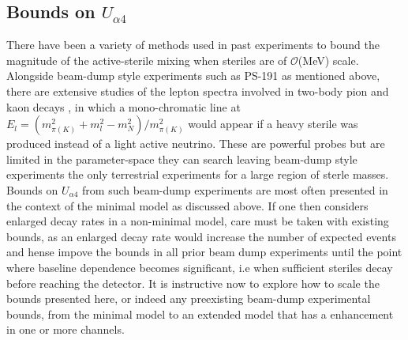 \documentclass[11pt, a4paper]{article}
\newcommand{\refref}[1]{Ref.~\cite{#1}}
\def\ster{\ensuremath N}
\begin{document}
%
%
\subsection{Bounds on $U_{\alpha 4}$}

There have been a variety of methods used in past experiments to bound the
magnitude of the active-sterile mixing when steriles are of $\mathcal{O}$(MeV)
scale. Alongside beam-dump style experiments such as PS-191 as mentioned above,
there are extensive studies of the lepton spectra involved in two-body pion and
kaon decays\cite{PhysRevD.46.R885,PhysRevLett.68.3000} , in which a
mono-chromatic line at $E_l = \left( m_{\pi
(K)}^2+m_l^2-m_N^2\right)/m_{\pi(K)}^2$ would appear if a heavy sterile was
produced instead of a light active neutrino. These are powerful probes but are
limited in the parameter-space they can search leaving beam-dump style
experiments the only terrestrial experiments for a large region of sterle
masses. \\ 

Bounds on $U_{\alpha 4}$ from such beam-dump experiments are most often
presented in the context of the minimal model as discussed above. If one then
considers enlarged decay rates in a non-minimal model, care must be taken with
existing bounds, as an enlarged decay rate would increase the number of
expected events and hense impove the bounds in all prior beam dump experiments
until the point where baseline dependence becomes significant, i.e when
sufficient steriles decay before reaching the detector. It is instructive now
to explore how to scale the bounds presented here, or indeed any preexisting
beam-dump experimental bounds, from the minimal model to an extended model that
has a enhancement in one or more channels.
\end{document}
